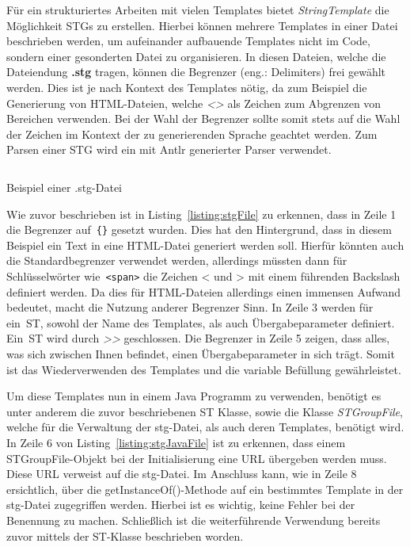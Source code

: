 Für ein strukturiertes Arbeiten mit vielen Templates bietet \textit{StringTemplate} die Möglichkeit \ac{STG}s zu erstellen.
Hierbei können mehrere Templates in einer Datei beschrieben werden, um aufeinander aufbauende Templates nicht im Code, sondern einer gesonderten Datei zu organisieren.
In diesen Dateien, welche die Dateiendung \textbf{.stg} tragen, können die Begrenzer (eng.: Delimiters) frei gewählt werden.
Dies ist je nach Kontext des Templates nötig, da zum Beispiel die Generierung von HTML-Dateien, welche \textit{<>} als Zeichen zum Abgrenzen von Bereichen verwenden.
Bei der Wahl der Begrenzer sollte somit stets auf die Wahl der Zeichen im Kontext der zu generierenden Sprache geachtet werden.
Zum Parsen einer \ac{STG} wird ein mit Antlr generierter Parser verwendet.\cite*{stgParser}

\begin{listing}[ht]
    \inputminted{c}{listings/2.2.1/Example.stg}
    \caption{Beispiel einer .stg-Datei}
    \label{listing:stgFile}
\end{listing}

Wie zuvor beschrieben ist in Listing~\ref{listing:stgFile} zu erkennen, dass in Zeile 1 die Begrenzer auf~\texttt{\{\}} gesetzt wurden.
Dies hat den Hintergrund, dass in diesem Beispiel ein Text in eine HTML-Datei generiert werden soll.
Hierfür könnten auch die Standardbegrenzer verwendet werden, allerdings müssten dann für Schlüsselwörter wie~\texttt{<span>} die Zeichen < und > mit einem führenden Backslash definiert werden.
Da dies für HTML-Dateien allerdings einen immensen Aufwand bedeutet, macht die Nutzung anderer Begrenzer Sinn.
In Zeile 3 werden für ein~\ac{ST}, sowohl der Name des Templates, als auch Übergabeparameter definiert.
Ein~\ac{ST} wird durch \textit{>>} geschlossen.
Die Begrenzer in Zeile 5 zeigen, dass alles, was sich zwischen Ihnen befindet, einen Übergabeparameter in sich trägt.
Somit ist das Wiederverwenden des Templates und die variable Befüllung gewährleistet.

Um diese Templates nun in einem Java Programm zu verwenden, benötigt es unter anderem die zuvor beschriebenen ST Klasse, sowie
die Klasse \textit{STGroupFile}, welche für die Verwaltung der stg-Datei, als auch deren Templates, benötigt wird.
In Zeile 6 von Listing~\ref{listing:stgJavaFile} ist zu erkennen, dass einem STGroupFile-Objekt bei der Initialisierung eine URL übergeben werden muss.
Diese URL verweist auf die stg-Datei.
Im Anschluss kann, wie in Zeile 8 ersichtlich, über die getInstanceOf()-Methode auf ein bestimmtes Template in der stg-Datei zugegriffen werden.
Hierbei ist es wichtig, keine Fehler bei der Benennung zu machen.
Schließlich ist die weiterführende Verwendung bereits zuvor mittels der ST-Klasse beschrieben worden.

